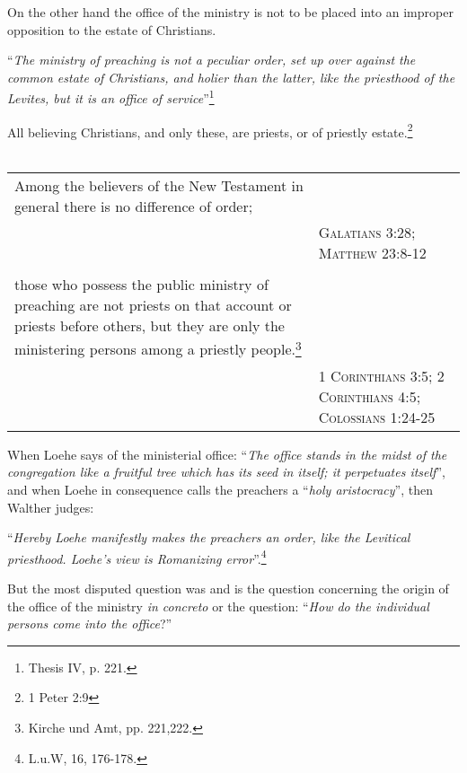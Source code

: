                 On the other hand the office of the ministry is not to be placed into an improper opposition to the estate of Christians. \begin{displayquote} “\textit{The ministry of preaching is not a peculiar order, set up over against the common estate of Christians, and holier than the latter, like the priesthood of the Levites, but it is an office of service}”\footnote{Thesis IV, p. 221.}\end{displayquote}  All believing Christians, and only these, are priests, or of priestly estate.\footnote{1 Peter 2:9}\\\\\begin{tabulary}{.88\textwidth}{JJ}  Among the believers of the New Testament in general there is no difference of order; & \\ & {\scriptsize\textsc{Galatians 3:28;  Matthew 23:8-12}} \\\\ those who possess the public ministry of preaching are not priests on that account or priests before others, but they are only the ministering persons among a priestly people.\footnote{Kirche und Amt, pp. 221,222.} & \\ & {\scriptsize\textsc{1 Corinthians 3:5; 2 Corinthians 4:5; Colossians 1:24-25}}\\\end{tabulary} \divider When Loehe says of the ministerial office: “\textit{The office stands in the midst of the congregation like a fruitful tree which has its seed in itself; it perpetuates itself}”, and when Loehe in consequence calls the preachers a “\textit{holy aristocracy}”, then Walther judges: \begin{displayquote}“\textit{Hereby Loehe manifestly makes the preachers an order, like the Levitical priesthood.  Loehe’s view is Romanizing error}”.\footnote{L.u.W, 16, 176-178.}\end{displayquote}

                But the most disputed question was and is the question concerning the origin of the office of the ministry \textit{in concreto} or the question: “\textit{How do the individual persons come into the office}?”

